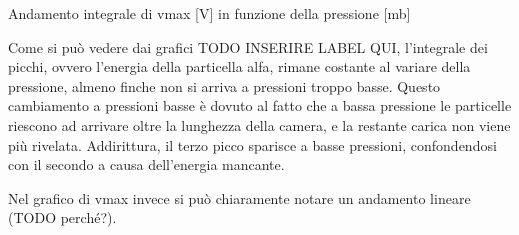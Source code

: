 \begin{grafico}
 \centering
 \caption{Andamento integrale di vmax [V] in funzione della pressione [mb]} 
 \label{gr:picchi_vmax} 
\end{grafico}

Come si può vedere dai grafici TODO INSERIRE LABEL QUI, l'integrale dei picchi, ovvero l'energia della particella alfa, rimane costante al variare della pressione,
almeno finche non si arriva a pressioni troppo basse. Questo cambiamento a pressioni basse è dovuto al fatto che a bassa pressione le particelle riescono ad arrivare oltre la lunghezza della camera, e la restante carica non viene più rivelata.
Addirittura, il terzo picco sparisce a basse pressioni, confondendosi con il secondo a causa dell'energia mancante.

Nel grafico di vmax invece si può chiaramente notare un andamento lineare (TODO perché?).

\FloatBarrier